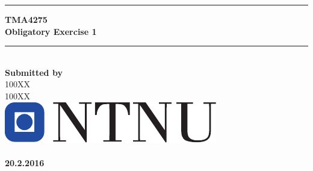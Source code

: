 \begin{center}
\thispagestyle{empty}
\rule{\textwidth}{1pt}\vspace{0.4cm}
\LARGE{\textbf{TMA4275\\Obligatory Exercise 1}}
\rule{\textwidth}{1pt}
\vspace{5cm}
\Large{\textbf{\\Submitted by\\}}
\vspace{0.3cm}
\Large{100XX\\100XX}\\
\vspace{4.5cm}
\includegraphics[scale=1.5]{project/images/ntnulogo.pdf}\\
\vspace{2cm}
\large{\textbf{\\20.2.2016}}\\[0.5cm]
\end{center}
\newpage